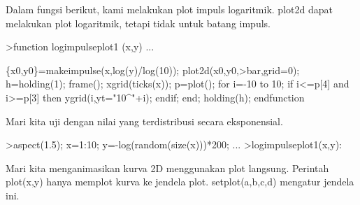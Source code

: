 \documentclass{article}
\begin{document}
\begin{eulernotebook}
\begin{eulercomment}
\begin{eulercomment}
\begin{eulercomment}
\begin{eulercomment}
\begin{eulercomment}
\begin{eulercomment}
\begin{eulercomment}
\begin{eulercomment}
\begin{eulercomment}
\begin{eulercomment}
\begin{eulercomment}
\begin{eulercomment}
\begin{eulercomment}
\begin{eulercomment}
\begin{eulercomment}
\begin{eulercomment}
\begin{eulercomment}
\begin{eulercomment}
\begin{eulercomment}
\begin{eulercomment}
\begin{eulercomment}
\begin{eulercomment}
\begin{eulercomment}
\begin{eulercomment}
\begin{eulercomment}
\begin{eulercomment}
\begin{eulercomment}
Dalam fungsi berikut, kami melakukan plot impuls logaritmik. plot2d
dapat melakukan plot logaritmik, tetapi tidak untuk batang impuls.
\end{eulercomment}
\begin{eulerprompt}
>function logimpulseplot1 (x,y) ...
\end{eulerprompt}
\begin{eulerudf}
    \{x0,y0\}=makeimpulse(x,log(y)/log(10));
    plot2d(x0,y0,>bar,grid=0);
    h=holding(1);
    frame();
    xgrid(ticks(x));
    p=plot();
    for i=-10 to 10;
      if i<=p[4] and i>=p[3] then
         ygrid(i,yt="10^"+i);
      endif;
    end;
    holding(h);
  endfunction
\end{eulerudf}
\begin{eulercomment}
Mari kita uji dengan nilai yang terdistribusi secara eksponensial.
\end{eulercomment}
\begin{eulerprompt}
>aspect(1.5); x=1:10; y=-log(random(size(x)))*200; ...
>logimpulseplot1(x,y):
\end{eulerprompt}
\begin{eulercomment}
Mari kita menganimasikan kurva 2D menggunakan plot langsung. Perintah
plot(x,y) hanya memplot kurva ke jendela plot. setplot(a,b,c,d)
mengatur jendela ini.


\end{eulercomment}
\end{eulercomment}
\end{eulercomment}
\end{eulercomment}
\end{eulercomment}
\end{eulercomment}
\end{eulercomment}
\end{eulercomment}
\end{eulercomment}
\end{eulercomment}
\end{eulercomment}
\end{eulercomment}
\end{eulercomment}
\end{eulercomment}
\end{eulercomment}
\end{eulercomment}
\end{eulercomment}
\end{eulercomment}
\end{eulercomment}
\end{eulercomment}
\end{eulercomment}
\end{eulercomment}
\end{eulercomment}
\end{eulercomment}
\end{eulercomment}
\end{eulercomment}
\end{eulercomment}
\end{eulernotebook}
\end{document}
